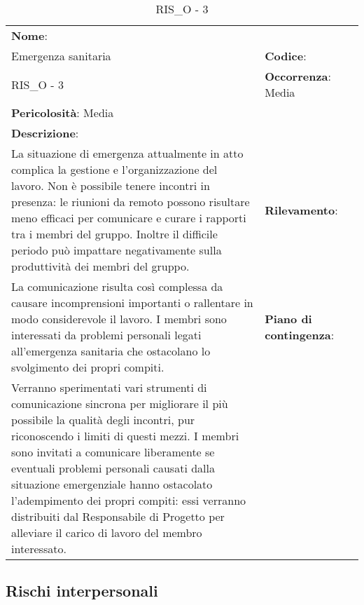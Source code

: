 \renewcommand{\arraystretch}{1.5}
\begin{longtable} { 
		>{\raggedright}p{} 
		>{\raggedright}p{} 
		>{\raggedright}p{}    }
	
	\caption{RIS\_O - 3} \endhead	
	
	
	\textbf{Nome}: \\ Emergenza sanitaria
	& \textbf{Codice}: \\ RIS\_O - 3
	& \textbf{Occorrenza}: Media \\ \textbf{Pericolosità}: Media
	
	\tabularnewline
	
	\textbf{Descrizione}: \\ La situazione di emergenza attualmente in atto complica la gestione e l'organizzazione del lavoro. Non è possibile tenere incontri in presenza: le riunioni da remoto possono risultare meno efficaci per comunicare e curare i rapporti tra i membri del gruppo. Inoltre il difficile periodo può impattare negativamente sulla produttività dei membri del gruppo.
	&
	\textbf{Rilevamento}: \\ La comunicazione risulta così complessa da causare incomprensioni importanti o rallentare in modo considerevole il lavoro. I membri sono interessati da problemi personali legati all'emergenza sanitaria che ostacolano lo svolgimento dei propri compiti.
	& 
	\textbf{Piano di contingenza}: \\ Verranno sperimentati vari strumenti di comunicazione sincrona per migliorare il più possibile la qualità degli incontri, pur riconoscendo i limiti di questi mezzi. I membri sono invitati a comunicare liberamente se eventuali problemi personali causati dalla situazione emergenziale hanno ostacolato l'adempimento dei propri compiti: essi verranno distribuiti dal Responsabile di Progetto per alleviare il carico di lavoro del membro interessato.

	
\end{longtable}



\subsection{Rischi interpersonali}



